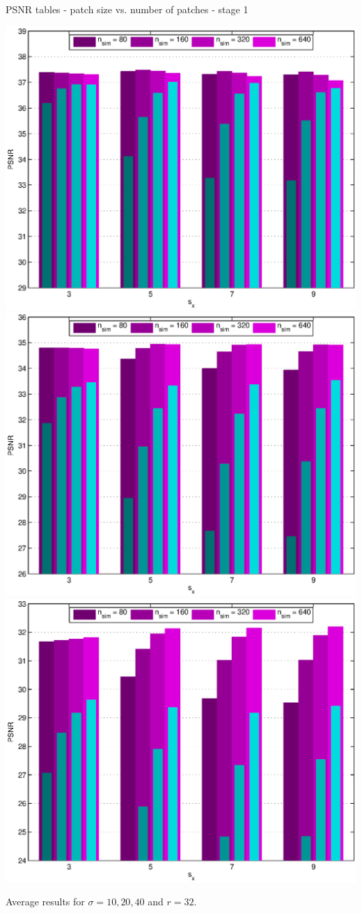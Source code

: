 \documentclass[mathserif, 8pt]{beamer}
\begin{document}
\begin{frame}{PSNR tables - patch size vs. number of patches - stage 1}
	\begin{center}
		\includegraphics[width=.33\textwidth]{psnr_px1-np1-bars_1r32_s10_average.eps}%
		\includegraphics[width=.33\textwidth]{psnr_px1-np1-bars_1r32_s20_average.eps}%
		\includegraphics[width=.33\textwidth]{psnr_px1-np1-bars_1r32_s40_average.eps}
	\end{center}
	\begin{center}
	Average results for $\sigma = 10, 20, 40$ and $r = 32$.
	\end{center}
\end{frame}
\end{document}
